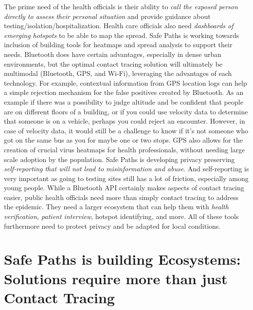 \documentclass[11pt]{article}
\begin{document}
The prime need of the health officials is their ability to \emph{call the exposed person directly to assess their personal situation} and provide guidance about testing/isolation/hospitalization. Health care officials also need \emph{dashboards of emerging hotspots} to be able to map the spread. Safe Paths is working towards inclusion of building tools for heatmaps and spread analysis to support their needs. Bluetooth does have certain advantages, especially in dense urban environments, but the optimal contact tracing solution will ultimately be multimodal (Bluetooth, GPS, and Wi-Fi), leveraging the advantages of each technology. For example, contextual information from GPS location logs can help a simple rejection mechanism for the false positives created by Bluetooth. As an example if there was a possibility to judge altitude and be confident that people are on different floors of a building, or if you could use velocity data to determine that someone is on a vehicle, perhaps you could reject an encounter. However, in case of velocity data, it would still be a challenge to know if it's not someone who got on the same bus as you for maybe one or two stops. GPS also allows for the creation of crucial virus heatmaps for health professionals, without needing large scale adoption by the population. Safe Paths is developing privacy preserving \emph{self-reporting that will not lead to misinformation and abuse}. And self-reporting is very important as going to testing sites still has a lot of friction, especially among young people. While a Bluetooth API certainly makes aspects of contact tracing easier, public health officials need more than simply contact tracing to address the epidemic. They need a larger ecosystem that can help them with \emph{health verification, patient interview}, hotspot identifying, and more. All of these tools furthermore need to protect privacy and be adapted for local conditions.

\section{Safe Paths is building Ecosystems: Solutions require more than just Contact Tracing}
\end{document}
